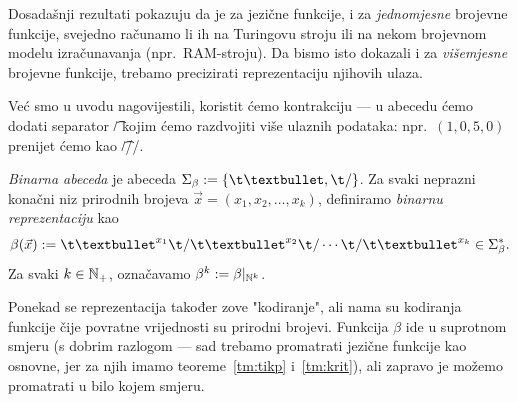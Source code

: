 Dosadašnji rezultati pokazuju da je za jezične funkcije, i za \emph{jednomjesne} brojevne funkcije, svejedno računamo li ih na Turingovu stroju ili na nekom brojevnom modelu izračunavanja (npr.\ RAM-stroju). Da bismo isto dokazali i za \emph{višemjesne} brojevne funkcije, trebamo precizirati reprezentaciju njihovih ulaza.


Već smo u uvodu nagovijestili, koristit ćemo kontrakciju --- u abecedu ćemo dodati separator \t/ kojim ćemo razdvojiti više ulaznih podataka: npr.\ $(1,0,5,0)$ prenijet ćemo kao \t{\textbullet//\textbullet\textbullet\textbullet\textbullet\textbullet/}.

\begin{definicija}[{name=[binarna abeceda i binarna reprezentacija]}]\label{def:beta}
\emph{Binarna abeceda} je abeceda $\Sigma_\beta:=\{\t\textbullet,\t/\}$. Za svaki neprazni konačni niz prirodnih brojeva $\vec x=(x_1,x_2,\dotsc,x_k)$, definiramo \emph{binarnu reprezentaciju} kao
\begin{equation}\label{eq:betadef}
    \beta(\vec x):=\t\textbullet^{x_1}\t/\t\textbullet^{x_2}\t/\dotsm\t/\t\textbullet^{x_k}\in\Sigma_\beta^*\text.
\end{equation}
Za svaki $k\in{\mathbb N}_+$, označavamo $\beta^k:=\beta|_{{\mathbb N}^k}$.
\end{definicija}

Ponekad se reprezentacija također zove "kodiranje", ali nama su kodiranja funkcije čije povratne vrijednosti su prirodni brojevi. Funkcija $\beta$ ide u suprotnom smjeru (s dobrim razlogom --- sad trebamo promatrati jezične funkcije kao osnovne, jer za njih imamo teoreme~\ref{tm:tikp} i~\ref{tm:krit}), ali zapravo je možemo promatrati u bilo kojem smjeru.


